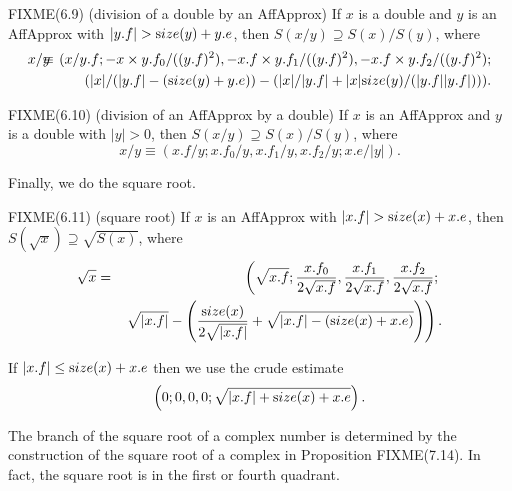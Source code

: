 \begin{proposition}{FIXME(6.9) {\textrm (division of a double by an AffApprox)}} If $x$ is a double and $y$ is an {\textrm AffApprox }
 with $|y.f| > {\textrm size}(y) + y.e${\textrm ,} then $S(x / y) \supseteq S(x) / S(y)${\textrm ,} where
\begin{eqnarray*}
x / y &\hskip-8pt\equiv\hskip-8pt& (x / y.f; -x \times y.f_0 /((y.f)^2), 
-x.f \times y.f_1 /((y.f)^2), -x.f \times y.f_2 /((y.f)^2); 
\\
&\hskip-8pt\hskip-8pt&\qquad (|x|  /(|y.f| - ({\textrm size}(y) + y.e)) - 
(|x|/|y.f|  + |x| {\textrm size}(y)/(|y.f||y.f|))).
                                              \end{eqnarray*}
\end{proposition}


\begin{proposition}{FIXME(6.10) {\textrm (division of an AffApprox by a double)}} If $x$ is an {\textrm AffApprox}  and $y$ is a double
with $|y| > 0${\textrm ,} then $S(x / y) \supseteq S(x) / S(y)${\textrm ,} where
$$
x / y \equiv (x.f / y; x.f_0 / y, 
x.f_1 / y, x.f_2 / y; 
x.e/ |y| ).
$$
\end{proposition}

Finally, we do the square root.

\begin{proposition}{FIXME(6.11) {\textrm (square root)}} If $x$ is an {\textrm AffApprox}  with $|x.f| > {\textrm size}(x) + x.e${\textrm ,}
 then $S(\sqrt x)
\supseteq
\sqrt {S(x)}${\textrm ,} where
\begin{eqnarray*}
\sqrt x& = &\left(\sqrt {x.f}; 
 {x.f_0 \over 2 \sqrt {x.f}}, 
 {x.f_1 \over 2 \sqrt {x.f}}, 
 {x.f_2 \over 2 \sqrt {x.f}};
\right.\\
&& \left. \sqrt {|x.f|} - \left({{\textrm size}(x) \over 2 \sqrt {|x.f|}} + \sqrt {|x.f| - ({\textrm size}(x) + x.e)}\right)
                                              \right).
\end{eqnarray*}
\end{proposition} 
If $|x.f| \le {\textrm size}(x) + x.e$ then we use the crude estimate $$\left(0;0,0,0;\sqrt{|x.f| + {\textrm size}(x) + x.e}\right).$$
 
The branch of the square root of a complex number is determined by the construction of the square root of a complex in Proposition FIXME(7.14).  In fact, the square root is in the first or fourth quadrant.

